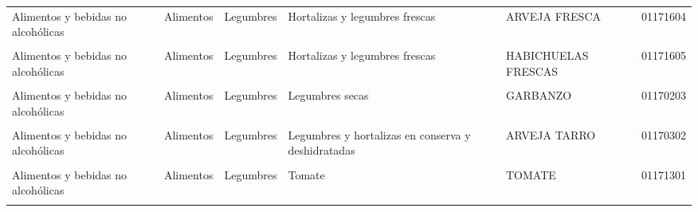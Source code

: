 \begin{longtable}[t]{lllllc}
\hspace{1em}Alimentos y bebidas no alcohólicas & Alimentos & Legumbres & Hortalizas y legumbres frescas & ARVEJA FRESCA & 01171604\\
\hspace{1em}\cellcolor{gray!10}{Alimentos y bebidas no alcohólicas} & \cellcolor{gray!10}{Alimentos} & \cellcolor{gray!10}{Legumbres} & \cellcolor{gray!10}{Hortalizas y legumbres frescas} & \cellcolor{gray!10}{FRÍJOL FRESCO} & \cellcolor{gray!10}{01171603}\\
\hspace{1em}Alimentos y bebidas no alcohólicas & Alimentos & Legumbres & Hortalizas y legumbres frescas & HABICHUELAS FRESCAS & 01171605\\
\hspace{1em}\cellcolor{gray!10}{Alimentos y bebidas no alcohólicas} & \cellcolor{gray!10}{Alimentos} & \cellcolor{gray!10}{Legumbres} & \cellcolor{gray!10}{Hortalizas y legumbres frescas} & \cellcolor{gray!10}{LECHUGA} & \cellcolor{gray!10}{01171602}\\
\hspace{1em}Alimentos y bebidas no alcohólicas & Alimentos & Legumbres & Legumbres secas & GARBANZO & 01170203\\
\hspace{1em}\cellcolor{gray!10}{Alimentos y bebidas no alcohólicas} & \cellcolor{gray!10}{Alimentos} & \cellcolor{gray!10}{Legumbres} & \cellcolor{gray!10}{Legumbres secas} & \cellcolor{gray!10}{LENTEJAS} & \cellcolor{gray!10}{01170202}\\
\hspace{1em}Alimentos y bebidas no alcohólicas & Alimentos & Legumbres & Legumbres y hortalizas en conserva y deshidratadas & ARVEJA TARRO & 01170302\\
\hspace{1em}\cellcolor{gray!10}{Alimentos y bebidas no alcohólicas} & \cellcolor{gray!10}{Alimentos} & \cellcolor{gray!10}{Legumbres} & \cellcolor{gray!10}{Papas} & \cellcolor{gray!10}{PAPA CRIOLLA} & \cellcolor{gray!10}{01170502}\\
\hspace{1em}Alimentos y bebidas no alcohólicas & Alimentos & Legumbres & Tomate & TOMATE & 01171301\\
\hspace{1em}\cellcolor{gray!10}{Alimentos y bebidas no alcohólicas} & \cellcolor{gray!10}{Alimentos} & \cellcolor{gray!10}{Legumbres} & \cellcolor{gray!10}{Yuca para consumo en el hogar} & \cellcolor{gray!10}{YUCA} & \cellcolor{gray!10}{01170601}\\

\end{longtable}
